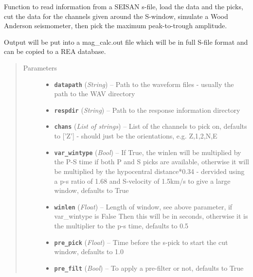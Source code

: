 \documentclass[a4paper,10pt,english]{sphinxmanual}
\begin{document}
\begin{fulllineitems}
\label{utils:mag_calc.Amp_pick_sfile}
Function to read information from a SEISAN s-file, load the data and the
picks, cut the data for the channels given around the S-window, simulate
a Wood Anderson seismometer, then pick the maximum peak-to-trough
amplitude.

Output will be put into a mag\_calc.out file which will be in full S-file
format and can be copied to a REA database.
\begin{quote}\begin{description}
\item[{Parameters}] \leavevmode\begin{itemize}
\item {} 
\textbf{\texttt{datapath}} (\emph{String}) -- Path to the waveform files - usually the path to the WAV directory

\item {} 
\textbf{\texttt{respdir}} (\emph{String}) -- Path to the response information directory

\item {} 
\textbf{\texttt{chans}} (\emph{List of strings}) -- List of the channels to pick on, defaults to {[}'Z'{]} - should
just be the orientations, e.g. Z,1,2,N,E

\item {} 
\textbf{\texttt{var\_wintype}} (\emph{Bool}) -- If True, the winlen will be
multiplied by the P-S time if both P and S picks are
available, otherwise it will be multiplied by the hypocentral
distance*0.34 - dervided using a p-s ratio of 1.68 and
S-velocity of 1.5km/s to give a large window, defaults to True

\item {} 
\textbf{\texttt{winlen}} (\emph{Float}) -- Length of window, see above parameter, if var\_wintype is False
Then this will be in seconds, otherwise it is the multiplier
to the p-s time, defaults to 0.5

\item {} 
\textbf{\texttt{pre\_pick}} (\emph{Float}) -- Time before the s-pick to start the cut window, defaults
to 1.0

\item {} 
\textbf{\texttt{pre\_filt}} (\emph{Bool}) -- To apply a pre-filter or not, defaults to True


\end{itemize}
\end{description}
\end{quote}
\end{fulllineitems}
\end{document}
